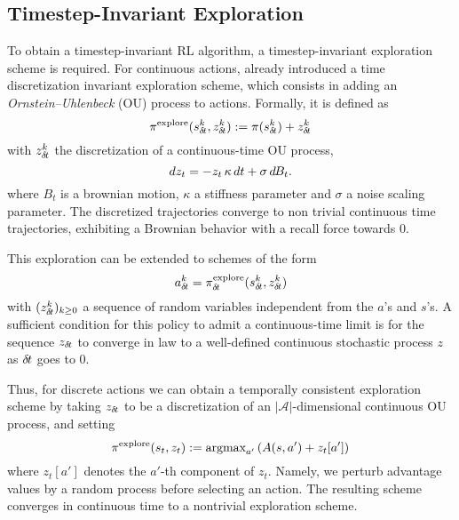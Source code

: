 \subsection{Timestep-Invariant Exploration}
\label{subsec:explo}

To obtain a timestep-invariant RL algorithm, a timestep-invariant
exploration scheme is required. 
For continuous actions, \cite{ddpg} already introduced a time discretization invariant exploration scheme, which consists in adding an
\emph{Ornstein--Uhlenbeck} \cite{orn-uhl} (OU) process to actions. Formally, it is defined as
\begin{equation}
	\pi^\text{explore}(s^k_{\delta\hspace{-.1em}t}, z^k_{\delta\hspace{-.1em}t}) \mathrel{\mathop{:}}= \pi(s^k_{\delta\hspace{-.1em}t}) + z^k_{\delta\hspace{-.1em}t}
\end{equation}
with $z^k_{\delta\hspace{-.1em}t}$ the discretization of a continuous-time OU process,
\begin{equation}
	dz_t = - z_t \,\kappa\, dt + \sigma \,d\hspace{-.1em}B_t.
	\label{eq:orn_uhl}
\end{equation}
where $B_t$ is a brownian motion, $\kappa$ a stiffness parameter and
$\sigma$ a noise scaling parameter. The discretized trajectories converge
to non trivial continuous time trajectories, exhibiting a Brownian
behavior with a recall force towards $0$.

This exploration can be extended to schemes of the form
\begin{equation}
  \label{eq:explore}
	a^k_{\delta\hspace{-.1em}t} = \pi^\text{explore}_{\delta\hspace{-.1em}t}(s^k_{\delta\hspace{-.1em}t}, z^k_{\delta\hspace{-.1em}t})
\end{equation}
with $(z^k_{\delta\hspace{-.1em}t})_{k\geq 0}$ a sequence of random variables independent from the $a$'s and $s$'s.
A sufficient condition for this policy to admit a continuous-time
limit is for the sequence
$z_{\delta\hspace{-.1em}t}$ to converge in law to a
well-defined continuous stochastic process $z$ as ${\delta\hspace{-.1em}t}$ goes to $0$.

Thus, for discrete actions we can obtain a temporally consistent
exploration scheme by taking
$z_{\delta\hspace{-.1em}t}$ to be a discretization of an $|\mathcal{A}|$-dimensional
continuous OU process, and setting
\begin{equation}
  \pi^\text{explore}(s_t, z_t)\mathrel{\mathop{:}}= \text{argmax}_{a'} \left(A(s, a') + z_t[a']\right)
\end{equation}
where $z_t[a']$ denotes the $a'$-th component of $z_t$. Namely, we
perturb advantage values by a random process before selecting an action. The resulting scheme
converges in continuous time to a nontrivial exploration scheme.

